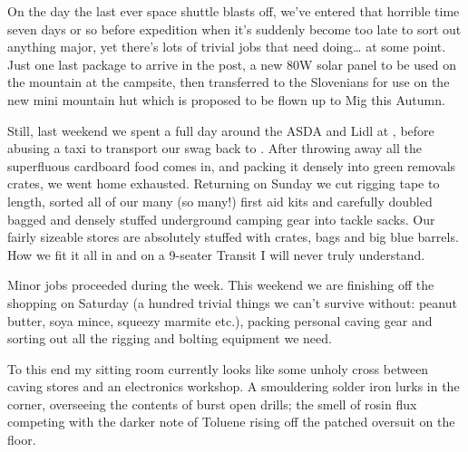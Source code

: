 On the day the last ever space shuttle blasts off, we’ve entered that
horrible time seven days or so before expedition when it’s suddenly
become too late to sort out anything major, yet there’s lots of
trivial jobs that need doing\ldots{} at some point. Just one last package
to arrive in the post, a new 80W solar panel to be used on the
mountain at the campsite, then transferred to the Slovenians for use
on the new mini mountain hut which is proposed to be flown up to Mig
this Autumn.

Still, last weekend we spent a full day around the ASDA and Lidl at
, before abusing a taxi to transport our swag back to
. After throwing away all the superfluous cardboard food
comes in, and packing it densely into green removals crates, we went
home exhausted. Returning on Sunday we cut rigging tape to length,
sorted all of our many (so many!) first aid kits and carefully doubled
bagged and densely stuffed underground camping gear into tackle sacks.
Our fairly sizeable stores are absolutely stuffed with crates, bags
and big blue barrels. How we fit it all in and on a 9-seater Transit I
will never truly understand.

Minor jobs proceeded during the week. This weekend we are finishing
off the shopping on Saturday (a hundred trivial things we can’t
survive without: peanut butter, soya mince, squeezy marmite etc.),
packing personal caving gear and sorting out all the rigging and
bolting equipment we need.

To this end my sitting room currently looks like some unholy cross
between caving stores and an electronics workshop. A smouldering
solder iron lurks in the corner, overseeing the contents of burst open
drills; the smell of rosin flux competing with the darker note of
Toluene rising off the patched oversuit on the floor. 


